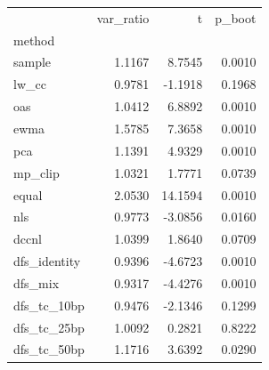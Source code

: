 \begin{tabular}{lrrr}
\toprule
 & var_ratio & t & p_boot \\
method &  &  &  \\
\midrule
sample & 1.1167 & 8.7545 & 0.0010 \\
lw_cc & 0.9781 & -1.1918 & 0.1968 \\
oas & 1.0412 & 6.8892 & 0.0010 \\
ewma & 1.5785 & 7.3658 & 0.0010 \\
pca & 1.1391 & 4.9329 & 0.0010 \\
mp_clip & 1.0321 & 1.7771 & 0.0739 \\
equal & 2.0530 & 14.1594 & 0.0010 \\
nls & 0.9773 & -3.0856 & 0.0160 \\
dccnl & 1.0399 & 1.8640 & 0.0709 \\
dfs_identity & 0.9396 & -4.6723 & 0.0010 \\
dfs_mix & 0.9317 & -4.4276 & 0.0010 \\
dfs_tc_10bp & 0.9476 & -2.1346 & 0.1299 \\
dfs_tc_25bp & 1.0092 & 0.2821 & 0.8222 \\
dfs_tc_50bp & 1.1716 & 3.6392 & 0.0290 \\
\bottomrule
\end{tabular}
